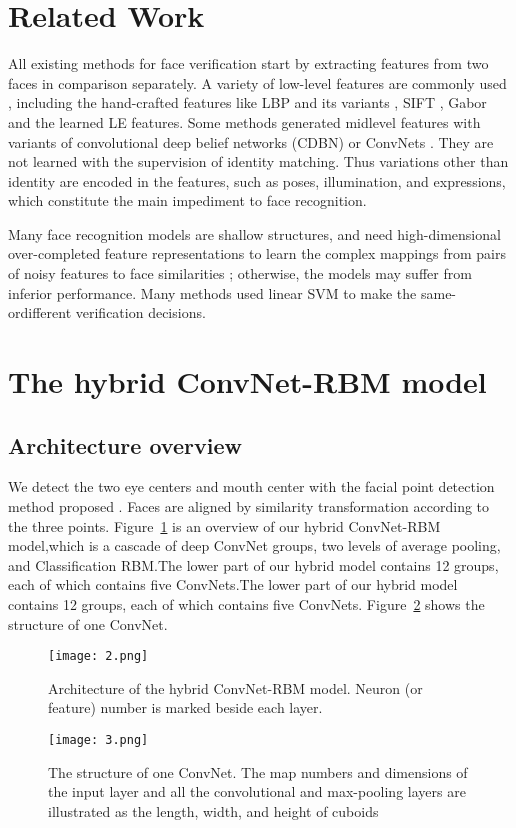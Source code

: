 \documentclass[10pt,twocolumn,letterpaper]{article}
\begin{document}
\section{\textbf{Related Work}}
All existing methods for face verification start by extracting features from two faces in comparison separately. A variety of low-level features are commonly used , including the hand-crafted features like LBP  and its variants \cite{Asscoiate2008}, SIFT , Gabor  and the learned LE features. Some methods generated midlevel features  with variants of convolutional deep belief networks (CDBN) or ConvNets . They are not learned with the supervision of identity matching. Thus variations other than identity are encoded in the features, such as poses, illumination, and expressions, which constitute the main impediment to face recognition.
\par
Many face recognition models are shallow structures, and need high-dimensional over-completed feature representations to learn the complex mappings from pairs of noisy features to face similarities ; otherwise, the models may suffer from inferior performance. Many methods  used linear SVM to make the same-ordifferent verification decisions.
\section{\textbf{The hybrid ConvNet-RBM model }}
\subsection{\textbf{Architecture overview}}
We detect the two eye centers and mouth center with the facial point detection method proposed . Faces are aligned by similarity transformation according to the three points. Figure~\ref{fig2} is an overview of our hybrid ConvNet-RBM model,which is a cascade of deep ConvNet groups, two levels of average pooling, and Classification RBM.The lower part of our hybrid model contains 12 groups, each of which contains five ConvNets.The lower part of our hybrid model contains 12 groups, each of which contains five ConvNets. Figure~\ref{fig3} shows the structure of one ConvNet.
\begin{figure}[htbp]
  \centering
  \texttt{[image: 2.png]}\\
  \caption{Architecture of the hybrid ConvNet-RBM model. Neuron (or feature) number is marked beside each layer.}\label{fig2}
\end{figure}
\begin{figure}[htbp]
  \centering
  \texttt{[image: 3.png]}\\
  \caption{The structure of one ConvNet. The map numbers and dimensions of the input layer and all the convolutional and max-pooling layers are illustrated as the length, width, and height of cuboids}\label{fig3}
\end{figure}
\end{document}
